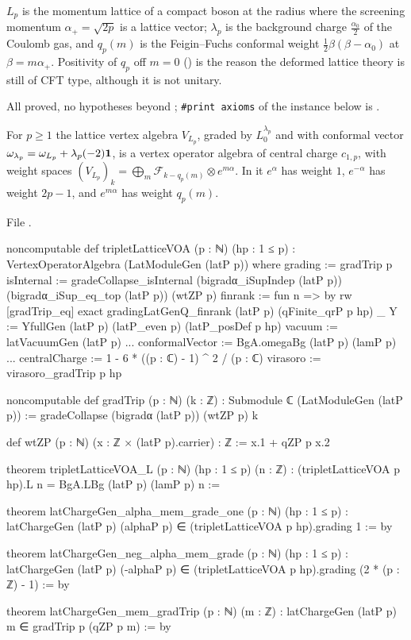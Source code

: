 \begin{physics}
$L_p$ is the momentum lattice of a compact boson at the radius where the screening momentum
$\alpha_+=\sqrt{2p}$ is a lattice vector; $\lambda_p$ is the background charge
$\frac{\alpha_0}{2}$ of the Coulomb gas, and $q_p(m)$ is the Feigin--Fuchs conformal weight
$\frac12\beta(\beta-\alpha_0)$ at $\beta=m\alpha_+$. Positivity of $q_p$ off $m=0$
() is the reason the deformed lattice theory is still of CFT type, although it is not
unitary.
\end{physics}
\begin{status}
All proved, no hypotheses beyond ; \texttt{\#print axioms} of the instance below is
.
\end{status}

\begin{theorem}\label{l18:thm:latVOA}
For $p\ge1$ the lattice vertex algebra $V_{L_p}$, graded by $L^{\lambda_p}_0$ and with conformal
vector $\omega_{\lambda_p}=\omega_{L_p}+\lambda_p(-2)\mathbf{1}$, is a vertex operator algebra of
central charge $c_{1,p}$, with weight spaces $(V_{L_p})_k=\bigoplus_{m}\mathcal F_{k-q_p(m)}\otimes e^{m\alpha}$.
In it $e^{\alpha}$ has weight $1$, $e^{-\alpha}$ has weight $2p-1$, and $e^{m\alpha}$ has weight $q_p(m)$.
\end{theorem}
\noindent File .
\begin{leancode}
noncomputable def tripletLatticeVOA (p : ℕ) (hp : 1 ≤ p) :
    VertexOperatorAlgebra (LatModuleGen (latP p)) where
  grading := gradTrip p
  isInternal :=
    gradeCollapse_isInternal (bigradα_iSupIndep (latP p)) (bigradα_iSup_eq_top (latP p)) (wtZP p)
  finrank := fun n => by
    rw [gradTrip_eq]
    exact gradingLatGenQ_finrank (latP p) (qFinite_qrP p hp) _
  Y := YfullGen (latP p) (latP_even p) (latP_posDef p hp)
  vacuum := latVacuumGen (latP p)
...
  conformalVector := BgA.omegaBg (latP p) (lamP p)
...
  centralCharge := 1 - 6 * ((p : ℂ) - 1) ^ 2 / (p : ℂ)
  virasoro := virasoro_gradTrip p hp
\end{leancode}
\begin{leancode}
noncomputable def gradTrip (p : ℕ) (k : ℤ) : Submodule ℂ (LatModuleGen (latP p)) :=
  gradeCollapse (bigradα (latP p)) (wtZP p) k

def wtZP (p : ℕ) (x : ℤ × (latP p).carrier) : ℤ := x.1 + qZP p x.2

theorem tripletLatticeVOA_L (p : ℕ) (hp : 1 ≤ p) (n : ℤ) :
    (tripletLatticeVOA p hp).L n = BgA.LBg (latP p) (lamP p) n :=

theorem latChargeGen_alpha_mem_grade_one (p : ℕ) (hp : 1 ≤ p) :
    latChargeGen (latP p) (alphaP p) ∈ (tripletLatticeVOA p hp).grading 1 := by

theorem latChargeGen_neg_alpha_mem_grade (p : ℕ) (hp : 1 ≤ p) :
    latChargeGen (latP p) (-alphaP p) ∈ (tripletLatticeVOA p hp).grading (2 * (p : ℤ) - 1) := by

theorem latChargeGen_mem_gradTrip (p : ℕ) (m : ℤ) :
    latChargeGen (latP p) m ∈ gradTrip p (qZP p m) := by
\end{leancode}
